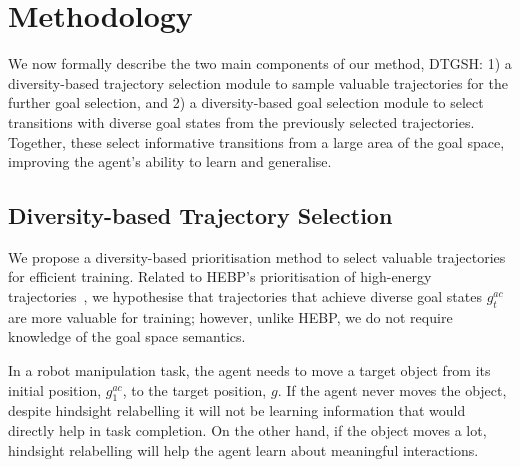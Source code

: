 \section{Methodology}
We now formally describe the two main components of our method, DTGSH: 1) a diversity-based trajectory selection module to sample valuable trajectories for the further goal selection, and 2) a diversity-based goal selection module to select transitions with diverse goal states from the previously selected trajectories. Together, these select informative transitions from a large area of the goal space, improving the agent's ability to learn and generalise.

\subsection{Diversity-based Trajectory Selection}
We propose a diversity-based prioritisation method to select valuable trajectories for efficient training. Related to HEBP's prioritisation of high-energy trajectories~\cite{zhao2018energy}, we hypothesise that trajectories that achieve diverse goal states $g^{ac}_{t}$ are more valuable for training; however, unlike HEBP, we do not require knowledge of the goal space semantics.

In a robot manipulation task, the agent needs to move a target object from its initial position, $g^{ac}_{1}$, to the target position, $g$. If the agent never moves the object, despite hindsight relabelling it will not be learning information that would directly help in task completion. On the other hand, if the object moves a lot, hindsight relabelling will help the agent learn about meaningful interactions.

